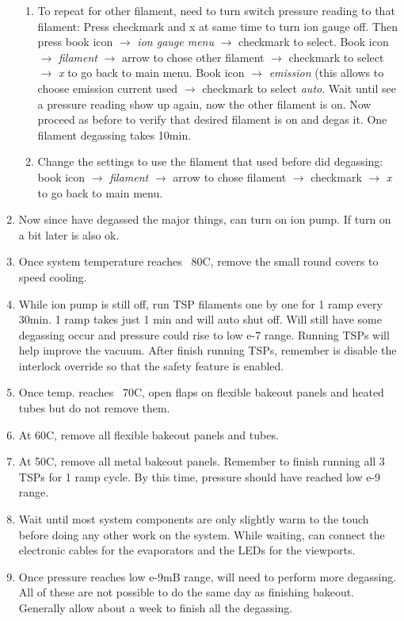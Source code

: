 \begin{enumerate}
\begin{enumerate}
\item	To repeat for other filament, need to turn switch pressure reading to that filament: Press checkmark and x at same time to turn ion gauge off. Then press book icon $\rightarrow$ \emph{ion gauge menu} $\rightarrow$ checkmark to select. Book icon $\rightarrow$ \emph{filament} $\rightarrow$ arrow to chose other filament $\rightarrow$ checkmark to select $\rightarrow$ \emph{x} to go back to main menu. Book icon $\rightarrow$  \emph{emission} (this allows to choose emission current used $\rightarrow$ checkmark to select \emph{auto}. Wait until see a pressure reading show up again, now the other filament is on. Now proceed as before to verify that desired filament is on and degas it. One filament degassing takes 10min. 
\item	Change the settings to use the filament that used before did degassing: book icon $\rightarrow$ \emph{filament} $\rightarrow$ arrow to chose filament $\rightarrow$ checkmark $\rightarrow$ \emph{x} to go back to main menu.
\end{enumerate}
\item	Now since have degassed the major things, can turn on ion pump. If turn on a bit later is also ok.
\item	Once system temperature reaches ~80C, remove the small round covers to speed cooling.
\item	While ion pump is still off, run TSP filaments one by one for 1 ramp every 30min. 1 ramp takes just 1 min and will auto shut off. Will still have some degassing occur and pressure could rise to low e-7 range. Running TSPs will help improve the vacuum. After finish running TSPs, remember is disable the interlock override so that the safety feature is enabled.
\item	Once temp. reaches ~70C, open flaps on flexible bakeout panels and heated tubes but do not remove them.
\item   At 60C, remove all flexible bakeout panels and tubes.
\item	At 50C, remove all metal bakeout panels.  Remember to finish running all 3 TSPs for 1 ramp cycle. By this time, pressure should have reached low e-9 range.
\item	Wait until most system components are only slightly warm to the touch before doing any other work on the system. While waiting, can connect the electronic cables for the evaporators and the LEDs for the viewports.
\item	Once pressure reaches low e-9mB range, will need to perform more degassing. All of these are not possible to do the same day as finishing bakeout. Generally allow about a week to finish all the degassing.

\end{enumerate}
